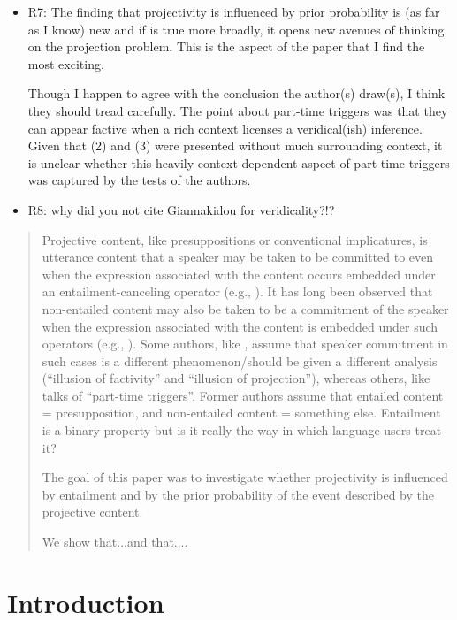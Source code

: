\documentclass[11pt,fleqn]{article}
\newcommand{\6}{\mbox{$[\hspace*{-.6mm}[$}}
\newcommand{\9}{\mbox{$]\hspace*{-.6mm}]$}}
\begin{document}
\begin{itemize}
\item R7: The finding that projectivity is influenced by prior probability is (as far as I know) new and if is true more broadly, it opens new avenues of thinking on the projection problem. This is the aspect of the paper that I find the most exciting.

Though I happen to agree with the conclusion the author(s) draw(s), I think they should tread carefully. The point about part-time triggers was that they can appear factive when a rich context licenses a veridical(ish) inference. Given that (2) and (3) were presented without much surrounding context, it is unclear whether this heavily context-dependent aspect of part-time triggers was captured by the tests of the authors.

\item R8: why did you not cite Giannakidou for veridicality?!?

\end{itemize}

\newpage

\begin{abstract}
Projective content, like presuppositions or conventional implicatures, is utterance content that a speaker may be taken to be committed to even when the expression associated with the content occurs embedded under an entailment-canceling operator (e.g., \citealt{ccmg90}). It has long been observed that non-entailed content may also be taken to be a commitment of the speaker when the expression associated with the content is embedded under such operators (e.g., \citealt{simons01,schlenker10,best-question}). Some authors, like \citealt{anand-hacquard2014}, assume that speaker commitment in such cases is a different phenomenon/should be given a different analysis (``illusion of factivity'' and ``illusion of projection''), whereas others, like \citealt{schlenker10} talks of ``part-time triggers''. Former authors assume that entailed content = presupposition, and non-entailed content = something else. Entailment is a binary property but is it really the way in which language users treat it?

The goal of this paper was to investigate whether projectivity is influenced by entailment and by the prior probability of the event described by the projective content.

We show that...and that....
\end{abstract}
			
\section{Introduction}\label{s1}
\end{document}
